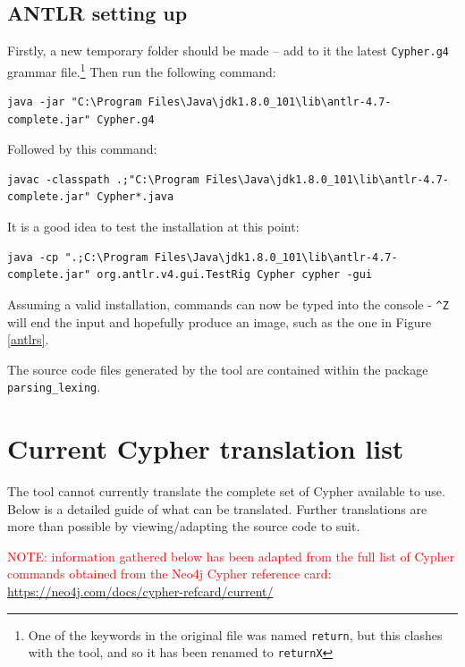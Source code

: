 \documentclass[letterpaper]{ltxdoc}
\begin{document}
\subsection{ANTLR setting up}

Firstly, a new temporary folder should be made -- add to it the latest \texttt{Cypher.g4} grammar file.\footnote{One of the keywords in the original file was named \texttt{return}, but this clashes with the tool, and so it has been renamed to \texttt{returnX}} Then run the following command:

\begin{lstlisting}[style=DOS]
java -jar "C:\Program Files\Java\jdk1.8.0_101\lib\antlr-4.7-complete.jar" Cypher.g4
\end{lstlisting}

Followed by this command:

\begin{lstlisting}[style=DOS]
javac -classpath .;"C:\Program Files\Java\jdk1.8.0_101\lib\antlr-4.7-complete.jar" Cypher*.java
\end{lstlisting}

It is a good idea to test the installation at this point:

\begin{lstlisting}[style=DOS]
java -cp ".;C:\Program Files\Java\jdk1.8.0_101\lib\antlr-4.7-complete.jar" org.antlr.v4.gui.TestRig Cypher cypher -gui
\end{lstlisting}

Assuming a valid installation, commands can now be typed into the console - \texttt{\^{}Z} will end the input and hopefully produce an image, such as the one in Figure \ref{antlrs}.

The source code files generated by the tool are contained within the package \texttt{parsing\_lexing}.

\section{Current Cypher translation list}
The tool cannot currently translate the complete set of Cypher available to use. Below is a detailed guide of what can be translated. Further translations are more than possible by viewing/adapting the source code to suit.

\medskip

\textcolor{red}{NOTE: information gathered below has been adapted from the full list of Cypher commands obtained from the Neo4j Cypher reference card: \url{https://neo4j.com/docs/cypher-refcard/current/}}
\end{document}
